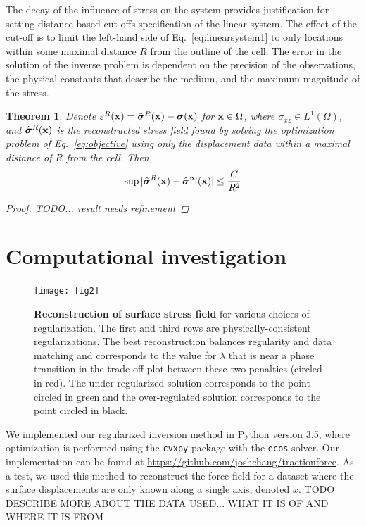 \documentclass[aps,prl,reprint,twocolumn,groupedaddress,showpacs]{revtex4-1}
\newtheorem{thm}{Theorem}%
\newcommand{\bsigma}{{\boldsymbol\sigma}}
\def\x{{\bf x}}
\begin{document}
The decay of the influence of stress on the system provides justification for setting distance-based
cut-offs specification of the linear system. The effect of the cut-off is to limit the left-hand side of Eq.~\ref{eq:linearsystem1} to only locations within some maximal distance $R$ from the outline of the cell.
The error in the solution of the inverse problem is dependent on the precision of the observations,
 the physical constants that describe the medium, and the maximum magnitude of the stress.

\begin{thm}
\label{thm:main}
Denote $\varepsilon^R(\x) = \hat{\bsigma}^R(\x) - \bsigma(\x)$ for $\x\in\Omega$, where $\sigma_{xz}\in L^1(\Omega)$, and $\hat{\bsigma}^R(\x)$ is the reconstructed stress field found by solving the optimization problem of Eq.~\ref{eq:objective} using only the displacement data within a maximal distance of $R$ from the cell. Then,
\begin{equation}
\sup \vert \hat{\bsigma}^R(\x) - \hat{\bsigma}^\infty(\x) \vert \leq \frac{C}{R^2}
\end{equation}

\begin{proof}
TODO... result needs refinement

\end{proof}

\end{thm}


\section{Computational investigation}

\begin{figure}
\texttt{[image: fig2]}
\caption{\textbf{Reconstruction of surface stress field} for various choices of regularization. The first and third rows are physically-consistent regularizations. The best reconstruction balances regularity and data matching and corresponds to the value for $\lambda$ that is near a phase transition in the trade off plot between these two penalties (circled in red). The under-regularized solution corresponds to the point circled in green and the over-regulated solution corresponds to the point circled in black.}
\label{fig:fig2}
\end{figure}

We implemented our regularized inversion method in Python version 3.5, where optimization is performed using the \texttt{cvxpy} package with the \texttt{ecos} solver.  Our implementation can be found at \url{https://github.com/joshchang/tractionforce}. As a test, we used this method to reconstruct the force field for a dataset where the surface displacements are only known along a single axis, denoted $x$. TODO DESCRIBE MORE ABOUT THE DATA USED... WHAT IT IS OF AND WHERE IT IS FROM
\end{document}
